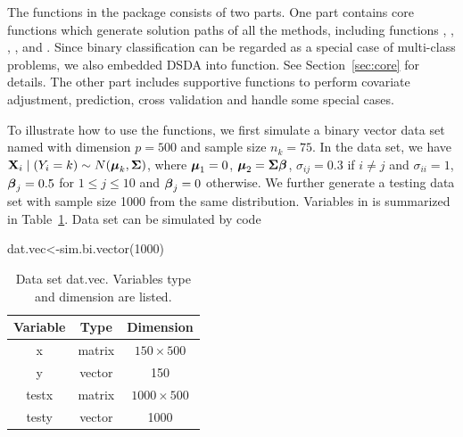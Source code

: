 The functions in the package consists of two parts. One part contains core functions which generate solution paths of all the methods, including functions , , , ,  and . Since binary classification can be regarded as a special case of multi-class problems, we also embedded DSDA into  function. See Section~\ref{sec:core} for details.
The other part includes supportive functions to perform covariate adjustment, prediction, cross validation and handle some special cases. 


To illustrate how to use the functions, we first simulate a binary vector data set named  with dimension $p=500$ and sample size $n_k=75$. In the data set, we have $\mathbf{X}_i\mid (Y_i=k) \sim N(\boldsymbol{\mu}_k,\boldsymbol{\Sigma})$, where $\boldsymbol{\mu}_1=0$, $\boldsymbol{\mu}_2=\boldsymbol{\Sigma}\boldsymbol{\beta}$, $\sigma_{ij}=0.3$ if $i\neq j$ and $\sigma_{ii}=1$, $\boldsymbol{\beta}_j=0.5$ for $1\leq j \leq 10$ and $\boldsymbol{\beta}_j=0$ otherwise. We further generate a testing data set with sample size 1000 from the same distribution. Variables in  is summarized in Table~\ref{tab:datvec}.  Data set  can be simulated by code
\begin{example}
dat.vec<-sim.bi.vector(1000)
\end{example}

% 


\begin{table}[ht]
 \centering
 \begin{tabular}{ccc}
  \toprule
  Variable&Type&Dimension\\
  \midrule
  x&matrix&$150\times 500$\\
  y&vector&150\\
  testx&matrix&$1000\times 500$\\
  testy&vector&1000\\
  \bottomrule
 \end{tabular}
 \caption{Data set dat.vec. Variables type and dimension are listed.}
 \label{tab:datvec}
\end{table}


